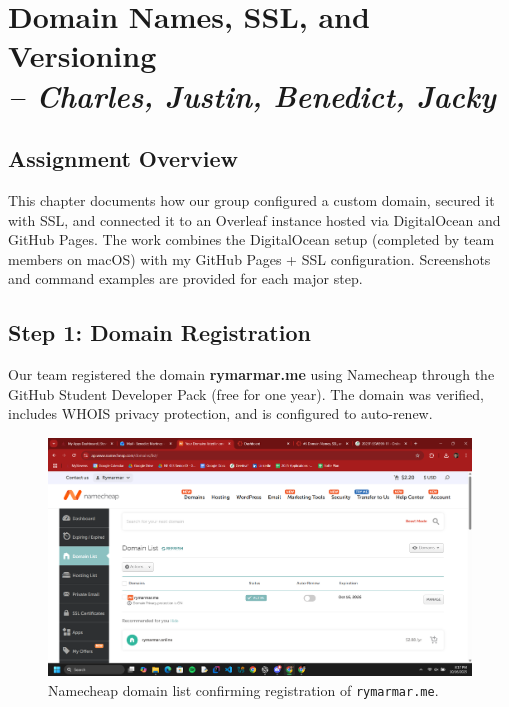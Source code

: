 \chapter[Domain Names]{Domain Names, SSL, and Versioning\\\small{\textit{-- Charles, Justin, Benedict, Jacky}}}
\label{Chapter::Domain Names}

\section{Assignment Overview}
This chapter documents how our group configured a custom domain, secured it with SSL, and connected it to an Overleaf instance hosted via DigitalOcean and GitHub Pages.  
The work combines the DigitalOcean setup (completed by team members on macOS) with my GitHub Pages + SSL configuration.  
Screenshots and command examples are provided for each major step.

\section{Step 1: Domain Registration}
Our team registered the domain \textbf{rymarmar.me} using Namecheap through the GitHub Student Developer Pack (free for one year).  
The domain was verified, includes WHOIS privacy protection, and is configured to auto-renew.

\begin{figure}[h!]
    \centering
    \includegraphics[width=\textwidth]{png/DomainNames/domain_list.png}
    \caption{Namecheap domain list confirming registration of \texttt{rymarmar.me}.}
\end{figure}

